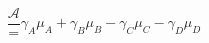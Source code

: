 \begin{equation}\label{eqn:reaction-affinity}
\frac{\mathcal{A}}={{\gamma }_{A}}{{\mu }_{A}}+{{\gamma }_{B}}{{\mu }_{B}}-{{\gamma }_{C}}{{\mu }_{C}}-{{\gamma }_{D}}{{\mu }_{D}}
\end{equation}